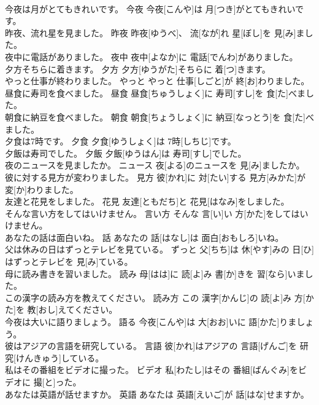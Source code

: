 \documentclass[8pt]{extreport}
\begin{document}
\begin{CJK}{UTF8}{min}
\\	今夜は月がとてもきれいです。	今夜	今夜[こんや]は 月[つき]がとてもきれいです。	
\\	昨夜、流れ星を見ました。	昨夜	昨夜[ゆうべ]、 流[なが]れ 星[ぼし]を 見[み]ました。	
\\	夜中に電話がありました。	夜中	夜中[よなか]に 電話[でんわ]がありました。	
\\	夕方そちらに着きます。	夕方	夕方[ゆうがた]そちらに 着[つ]きます。	
\\	やっと仕事が終わりました。	やっと	やっと 仕事[しごと]が 終[お]わりました。	
\\	昼食に寿司を食べました。	昼食	昼食[ちゅうしょく]に 寿司[すし]を 食[た]べました。	
\\	朝食に納豆を食べました。	朝食	朝食[ちょうしょく]に 納豆[なっとう]を 食[た]べました。	
\\	夕食は7時です。	夕食	夕食[ゆうしょく]は 7時[しちじ]です。	
\\	夕飯は寿司でした。	夕飯	夕飯[ゆうはん]は 寿司[すし]でした。	
\\	夜のニュースを見ましたか。	ニュース	夜[よる]のニュースを 見[み]ましたか。	
\\	彼に対する見方が変わりました。	見方	彼[かれ]に 対[たい]する 見方[みかた]が 変[か]わりました。	
\\	友達と花見をしました。	花見	友達[ともだち]と 花見[はなみ]をしました。	
\\	そんな言い方をしてはいけません。	言い方	そんな 言[い]い 方[かた]をしてはいけません。	
\\	あなたの話は面白いね。	話	あなたの 話[はなし]は 面白[おもしろ]いね。	
\\	父は休みの日はずっとテレビを見ている。	ずっと	父[ちち]は 休[やす]みの 日[ひ]はずっとテレビを 見[み]ている。	
\\	母に読み書きを習いました。	読み	母[はは]に 読[よ]み 書[か]きを 習[なら]いました。	
\\	この漢字の読み方を教えてください。	読み方	この 漢字[かんじ]の 読[よ]み 方[かた]を 教[おし]えてください。	
\\	今夜は大いに語りましょう。	語る	今夜[こんや]は 大[おお]いに 語[かた]りましょう。	
\\	彼はアジアの言語を研究している。	言語	彼[かれ]はアジアの 言語[げんご]を 研究[けんきゅう]している。	
\\	私はその番組をビデオに撮った。	ビデオ	私[わたし]はその 番組[ばんぐみ]をビデオに 撮[と]った。	
\\	あなたは英語が話せますか。	英語	あなたは 英語[えいご]が 話[はな]せますか。	

\end{CJK}
\end{document}
